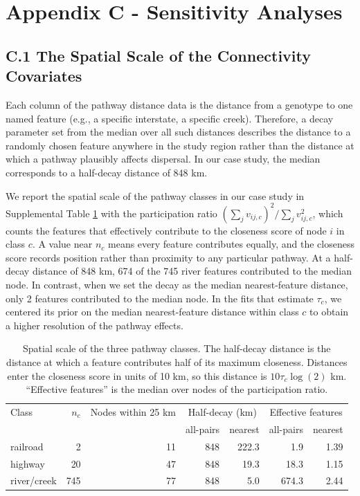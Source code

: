\documentclass{article}
\begin{document}
\section*{Appendix C - Sensitivity Analyses}
 
\subsection*{C.1 The Spatial Scale of the Connectivity Covariates}
 
Each column of the pathway distance data is the distance from a genotype to one named feature (e.g., a specific interstate, a specific creek). Therefore, a decay parameter set from the median over all such distances describes the distance to a randomly chosen feature anywhere in the study region rather than the distance at which a pathway plausibly affects dispersal. In our case study, the median corresponds to a half-decay distance of 848 km.
 
We report the spatial scale of the pathway classes in our case study in Supplemental Table \ref{tab:g1} with the participation ratio $(\sum_j v_{ij,c})^2/\sum_j v_{ij,c}^2$, which counts the features that effectively contribute to the closeness score of node $i$ in class $c$. A value near $n_c$ means every feature contributes equally, and the closeness score records position rather than proximity to any particular pathway. At a half-decay distance of 848 km, 674 of the 745 river features contributed to the median node. In contrast, when we set the decay as the median nearest-feature distance, only 2 features contributed to the median node. In the fits that estimate $\tau_c$, we centered its prior on the median nearest-feature distance within class $c$ to obtain a higher resolution of the pathway effects.
 
\begin{table}[h]
\caption{Spatial scale of the three pathway classes. The half-decay distance is the distance at which a feature contributes half of its maximum closeness. Distances enter the closeness score in units of 10 km, so this distance is $10\tau_c\log(2)$ km. ``Effective features'' is the median over nodes of the participation ratio.}
\begin{tabular}{l|rrrrrr}
\label{tab:g1}
Class & $n_c$ & Nodes within 25 km & \multicolumn{2}{c}{Half-decay (km)} & \multicolumn{2}{c}{Effective features} \\
      &       &                    & all-pairs & nearest & all-pairs & nearest \\ \hline
railroad    & 2   & 11 & 848 & 222.3 & 1.9   & 1.39 \\
highway     & 20  & 47 & 848 & 19.3  & 18.3  & 1.15 \\
river/creek & 745 & 77 & 848 & 5.0   & 674.3 & 2.44
\end{tabular}
\end{table}
\end{document}

